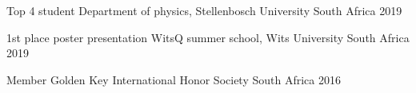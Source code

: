 \begin{cvhonors}

  \cvhonor
    {Top 4 student} %
    {Department of physics, Stellenbosch University} %
    {South Africa} %
    {2019} %


  \cvhonor
    {1st place poster presentation} %
    {WitsQ summer school, Wits University} %
    {South Africa} %
    {2019} %


  \cvhonor
    {Member} %
    {Golden Key International Honor Society} %
    {South Africa} %
    {2016} %




\end{cvhonors}
